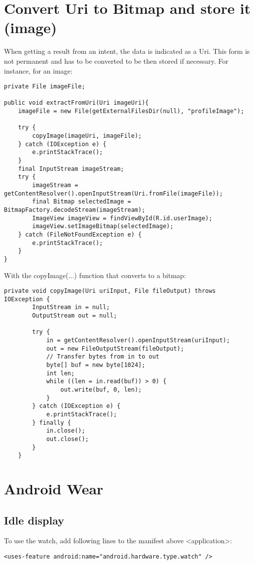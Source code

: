\documentclass[11pt]{article}
\begin{document}
\section{Convert Uri to Bitmap and store it (image)}
When getting a result from an intent, the data is indicated as a Uri. This form is not permanent and has to be converted to be then stored if necessary. For instance, for an image: 
\lstset{language = Java}
\begin{lstlisting}
private File imageFile;

public void extractFromUri(Uri imageUri){
    imageFile = new File(getExternalFilesDir(null), "profileImage");
    
    try {
        copyImage(imageUri, imageFile);
    } catch (IOException e) {
        e.printStackTrace();
    }
    final InputStream imageStream;
    try {
        imageStream = getContentResolver().openInputStream(Uri.fromFile(imageFile));
        final Bitmap selectedImage = BitmapFactory.decodeStream(imageStream);
        ImageView imageView = findViewById(R.id.userImage);
        imageView.setImageBitmap(selectedImage);
    } catch (FileNotFoundException e) {
        e.printStackTrace();
    }
}
\end{lstlisting}
With the copyImage(...) function that converts to a bitmap:
\lstset{language = Java}
\begin{lstlisting}
private void copyImage(Uri uriInput, File fileOutput) throws IOException {
        InputStream in = null;
        OutputStream out = null;

        try {
            in = getContentResolver().openInputStream(uriInput);
            out = new FileOutputStream(fileOutput);
            // Transfer bytes from in to out
            byte[] buf = new byte[1024];
            int len;
            while ((len = in.read(buf)) > 0) {
                out.write(buf, 0, len);
            }
        } catch (IOException e) {
            e.printStackTrace();
        } finally {
            in.close();
            out.close();
        }
    }
\end{lstlisting}



\section{Android Wear}
\subsection{Idle display}
To use the watch, add following lines to the manifest above \textless application\textgreater :
\lstset{language = XML}
\begin{lstlisting}
<uses-feature android:name="android.hardware.type.watch" />
\end{lstlisting}
\end{document}
